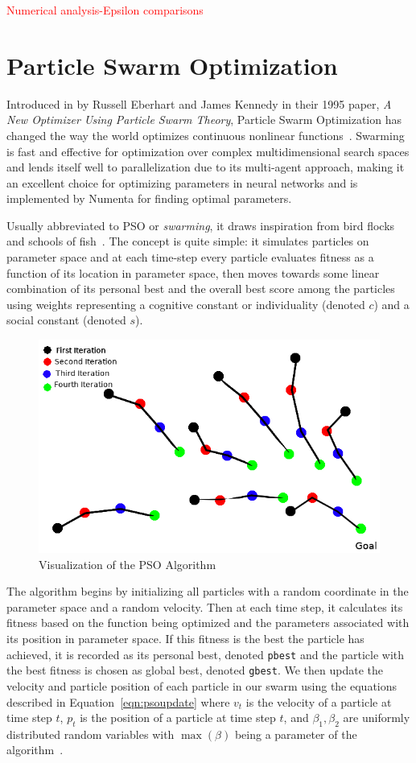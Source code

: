 \documentclass[oneside,12pt,openany]{book}
\begin{document}
	\textcolor{red}{Numerical analysis-Epsilon comparisons}
	
	\section{Particle Swarm Optimization}
	
	Introduced in by Russell Eberhart and James Kennedy in their 1995 paper, \textit{A New Optimizer Using Particle Swarm Theory}, Particle Swarm Optimization has changed the way the world optimizes continuous nonlinear functions~\cite{PSOReview}. Swarming is fast and effective for optimization over complex multidimensional search spaces and lends itself well to parallelization due to its multi-agent approach, making it an excellent choice for optimizing parameters in neural networks and is implemented by Numenta for finding optimal parameters.
	
	Usually abbreviated to PSO or \textit{swarming}, it draws inspiration from bird flocks and schools of fish~\cite{Eberhart}. The concept is quite simple: it simulates particles on parameter space and at each time-step every particle evaluates fitness as a function of its location in parameter space, then moves towards some linear combination of its personal best and the overall best score among the particles using weights representing a cognitive constant or individuality (denoted $c$) and a social constant (denoted $s$).
	
	\begin{figure}[!ht]
		\centering
		\includegraphics[width=.7\linewidth]{images/PSOVisual.png}
		\caption{Visualization of the PSO Algorithm}
		\label{fig:PSOVisual}
	\end{figure}
	
	The algorithm begins by initializing all particles with a random coordinate in the parameter space and a random velocity. Then at each time step, it calculates its fitness based on the function being optimized and the parameters associated with its position in parameter space. If this fitness is the best the particle has achieved, it is recorded as its personal best, denoted \texttt{pbest} and the particle with the best fitness is chosen as global best, denoted \texttt{gbest}. We then update the velocity and particle position of each particle in our swarm using the equations described in Equation~\eqref{eqn:psoupdate} where $v_{t}$ is the velocity of a particle at time step $t$, $p_{t}$ is the position of a particle at time step $t$, and $\beta_{1}, \beta_{2}$ are uniformly distributed random variables with $\max(\beta)$ being a parameter of the algorithm~\cite{PSOReview}.
	
\end{document}
